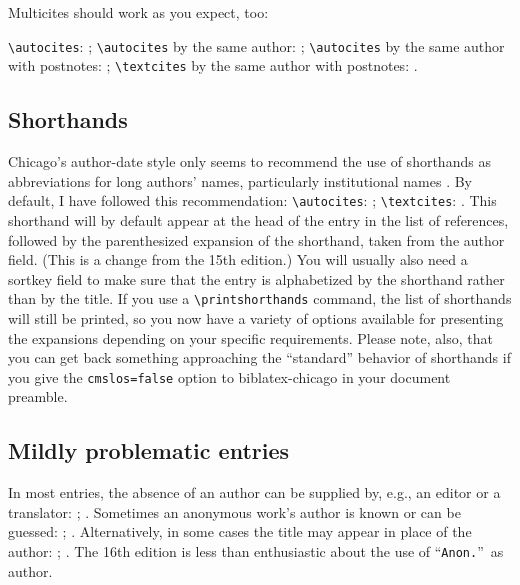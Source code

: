 \documentclass[a4paper,12pt]{report}
\newcommand{\cmd}[1]{\texttt{\textbackslash #1}}
\begin{document}
Multicites should work as you expect, too:

\cmd{autocites}: \autocites{dyna:browser}{eliot:pound};
\cmd{autocites} by the same author:
\autocites{pirumova}{pirumova:russian}; \cmd{autocites} by the same
author with postnotes: \autocites{pirumova}[14]{pirumova:russian};
\cmd{textcites} by the same author with postnotes:
\textcites[37]{pirumova}{pirumova:russian}.

\subsection*{Shorthands}
\label{sec:shorthands}

Chicago's author-date style only seems to recommend the use of
shorthands as abbreviations for long authors' names, particularly
institutional names \autocite[15.36]{chicago:manual}.  By default, I
have followed this recommendation: \cmd{autocites}:
\autocites{bsi:abbreviation}{iso:electrodoc}; \cmd{textcites}:
\textcites{bsi:abbreviation}{iso:electrodoc}.  This \textsf{shorthand}
will by default appear at the head of the entry in the list of
references, followed by the parenthesized expansion of the shorthand,
taken from the \textsf{author} field.  (This is a change from the 15th
edition.)  You will usually also need a \textsf{sortkey} field to make
sure that the entry is alphabetized by the \textsf{shorthand} rather
than by the \textsf{title}.  If you use a \cmd{printshorthands}
command, the list of shorthands will still be printed, so you now have
a variety of options available for presenting the expansions depending
on your specific requirements.  Please note, also, that you can get
back something approaching the \enquote{standard} behavior of
shorthands if you give the \texttt{cmslos=false} option to
\textsf{biblatex-chicago} in your document preamble.

\subsection*{Mildly problematic entries}
\label{sec:problematic}

In most entries, the absence of an author can be supplied by, e.g., an
editor or a translator: \autocite{chaucer:alt};
\autocite{silver:gawain}.  Sometimes an anonymous work's author is
known or can be guessed: \autocite{horsley:prosodies};
\autocite{cook:sotweed}.  Alternatively, in some cases the
\textsf{title} may appear in place of the \textsf{author}:
\autocite{anon:stanze}; \autocite{virginia:plantation}.  The 16th
edition is less than enthusiastic about the use of
\enquote{\texttt{Anon.}}\ as author.
\end{document}
